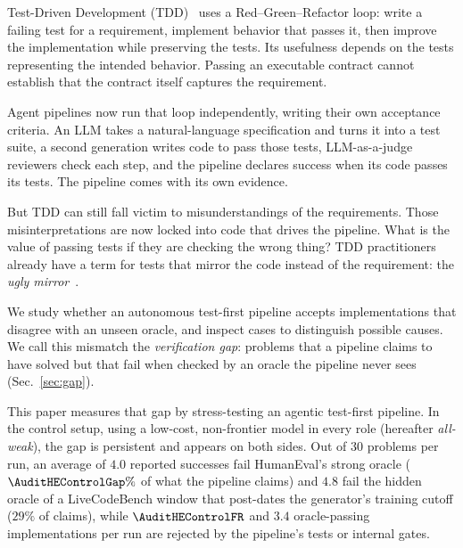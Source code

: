 \documentclass{article}
\begin{document}
Test-Driven Development (TDD)~\cite{beck2002tdd} uses a Red--Green--Refactor loop:
write a failing test for a requirement, implement behavior that passes it, then improve the
implementation while preserving the tests. Its usefulness depends on the tests representing
the intended behavior. Passing an executable contract cannot establish that the contract
itself captures the requirement.

Agent pipelines now run that loop independently, writing their own acceptance criteria. An LLM
takes a natural-language specification and turns it into a test suite, a second generation writes
code to pass those tests, LLM-as-a-judge reviewers check each step, and the pipeline declares
success when its code passes its tests. The pipeline comes with its own evidence.

But TDD can still fall victim to misunderstandings of the requirements. Those misinterpretations
are now locked into code that drives the pipeline. What is the value of passing tests if they are
checking the wrong thing? TDD practitioners already have a term for tests that mirror the code
instead of the requirement: the \emph{ugly mirror}~\cite{rudolph2008uglymirror}.

We study whether an autonomous test-first pipeline accepts implementations that disagree
with an unseen oracle, and inspect cases to distinguish possible causes. We call this
mismatch the \emph{verification gap}: problems that a pipeline claims to have solved but
that fail when checked by an oracle the pipeline never sees (Sec.~\ref{sec:gap}).

This paper measures that gap by stress-testing an agentic test-first pipeline. In the control
setup, using a low-cost, non-frontier model in every role (hereafter \emph{all-weak}), the gap is
persistent and appears on both sides. Out of 30 problems per run, an average of $4.0$ reported
successes fail HumanEval's strong oracle ($\AuditHEControlGap\%$ of what the pipeline claims) and $4.8$ fail the
hidden oracle of a LiveCodeBench window that post-dates the generator's training cutoff ($29\%$ of
claims), while $\AuditHEControlFR$ and $3.4$ oracle-passing implementations per run are rejected
by the pipeline's tests or internal gates.
\end{document}
